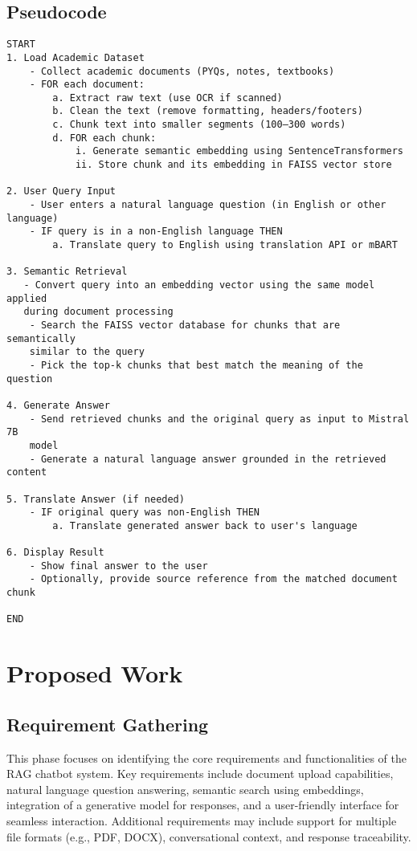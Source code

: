 \documentclass[12pt]{report}
\begin{document}
\newpage
\section{Pseudocode}
\begin{verbatim}
START
1. Load Academic Dataset
    - Collect academic documents (PYQs, notes, textbooks)
    - FOR each document:
        a. Extract raw text (use OCR if scanned)
        b. Clean the text (remove formatting, headers/footers)
        c. Chunk text into smaller segments (100–300 words)
        d. FOR each chunk:
            i. Generate semantic embedding using SentenceTransformers
            ii. Store chunk and its embedding in FAISS vector store

2. User Query Input
    - User enters a natural language question (in English or other language)
    - IF query is in a non-English language THEN
        a. Translate query to English using translation API or mBART

3. Semantic Retrieval
   - Convert query into an embedding vector using the same model applied 
   during document processing
    - Search the FAISS vector database for chunks that are semantically 
    similar to the query
    - Pick the top-k chunks that best match the meaning of the question

4. Generate Answer
    - Send retrieved chunks and the original query as input to Mistral 7B 
    model
    - Generate a natural language answer grounded in the retrieved content

5. Translate Answer (if needed)
    - IF original query was non-English THEN
        a. Translate generated answer back to user's language

6. Display Result
    - Show final answer to the user
    - Optionally, provide source reference from the matched document chunk

END
\end{verbatim}

\chapter{Proposed Work}
\section{Requirement Gathering}
This phase focuses on identifying the core requirements and functionalities of the RAG chatbot system. Key requirements include document upload capabilities, natural language question answering, semantic search using embeddings, integration of a generative model for responses, and a user-friendly interface for seamless interaction. Additional requirements may include support for multiple file formats (e.g., PDF, DOCX), conversational context, and response traceability.
\end{document}
